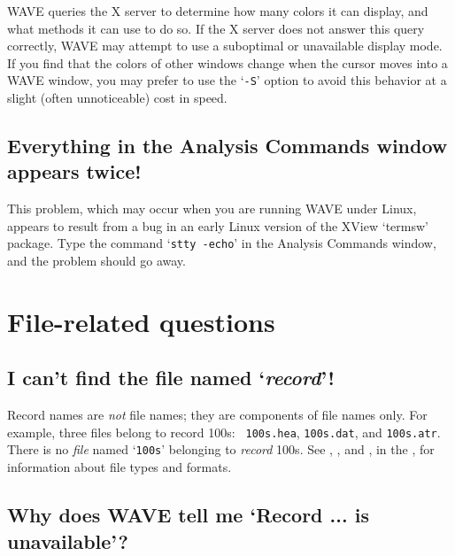\documentclass[twoside]{book}
\newcommand{\WAVE}{{\sf WAVE}\xspace}
\begin{document}
\index{S option for WAVE@{\tt -S} option for \WAVE{}}
\WAVE{} queries the X server to determine how many colors it can display, and
what methods it can use to do so.  If the X server does not answer this query
correctly, \WAVE{} may attempt to use a suboptimal or unavailable display mode.
If you find that the colors of other windows change when the cursor moves into
a \WAVE{} window, you may prefer to use the `{\tt -S}' option to avoid this
behavior at a slight (often unnoticeable) cost in speed.

\subsection{Everything in the {\sf Analysis Commands} window appears twice!}

This problem, which may occur when you are running \WAVE{} under Linux,
appears to result from a bug in an early Linux version of the XView
`termsw' package.  Type the command `{\tt stty -echo}' in the {\sf
Analysis Commands} window, and the problem should go away.

\section{File-related questions}
\label{faq:file-related-questions}

\subsection{I can't find the file named `\emph{record}'!}

\label{faq:cannot-find-record}
Record names are \emph{not} file names; they are components of file
names only.  For example, three files belong to record 100s: {\tt
100s.hea}, {\tt 100s.dat}, and {\tt 100s.atr}. There is no \emph{file} named
`{\tt 100s}' belonging to \emph{record} 100s.  See
,
, and
, in the
,
for information about file types and formats.

\subsection{Why does \WAVE{} tell me `Record ... is unavailable'?}
\end{document}
